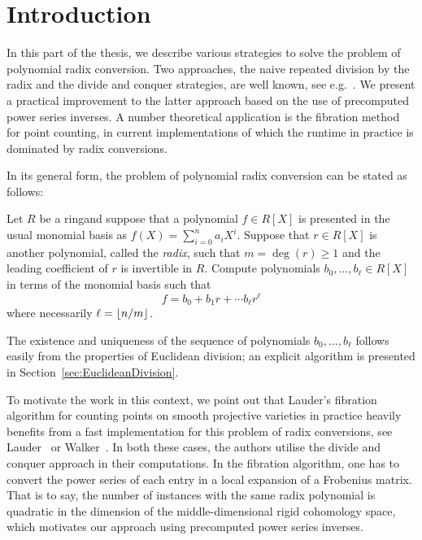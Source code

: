 
\chapter{Introduction}

In this part of the thesis, we describe various strategies to solve the 
problem of polynomial radix conversion.  Two approaches, the naive 
repeated division by the radix and the divide and conquer strategies, are 
well known, see e.g.~\citep[\S 9.2]{GathenGerhard2003}.  We present a 
practical improvement to the latter approach based on the use of 
precomputed power series inverses.  A number theoretical application is 
the fibration method for point counting, in current implementations of 
which the runtime in practice is dominated by radix conversions.

In its general form, the problem of polynomial radix conversion 
can be stated as follows:

\begin{prob} \label{prob:exact}
Let $R$ be a ring\footnotemark and suppose that a polynomial $f \in R[X]$ is 
presented in the usual monomial basis as $f(X) = \sum_{i=0}^{n} a_i X^i$.
Suppose that $r \in R[X]$ is another polynomial, called the \emph{radix}, 
such that $m = \deg(r) \geq 1$ and the leading coefficient of $r$ is invertible 
in $R$.  Compute polynomials $b_0, \dotsc, b_{\ell} \in R[X]$ in terms of 
the monomial basis such that 
\begin{equation}
f = b_0 + b_1 r + \dotsb b_{\ell} r^{\ell}
\end{equation}
where necessarily $\ell = \left\lfloor n / m\right\rfloor$.
\end{prob}


The existence and uniqueness of the sequence of polynomials $b_0, \dotsc, b_{\ell}$ 
follows easily from the properties of Euclidean division;  an explicit algorithm is 
presented in Section~\ref{sec:EuclideanDivision}.

To motivate the work in this context, we point out that Lauder's 
fibration algorithm for counting points on smooth projective varieties 
in practice heavily benefits from a fast implementation for this problem 
of radix conversions, see Lauder~\citep[\S 6.5.2]{Lauder2006} or 
Walker~\citep[\S 3.2.2]{Walker2009}.  In both these cases, the authors 
utilise the divide and conquer approach in their computations.  In the 
fibration algorithm, one has to convert the power series of each 
entry in a local expansion of a Frobenius matrix.  That is to say, 
the number of instances with the same radix polynomial is quadratic 
in the dimension of the middle-dimensional rigid cohomology space, 
which motivates our approach using precomputed power series inverses.

